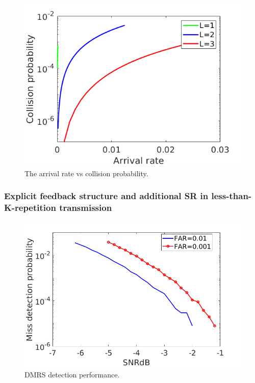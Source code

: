 \documentclass{ieeeaccess}
\begin{document}
\begin{figure}[htbp]
\centerline{\includegraphics[scale=0.32]{fig18.png}}
\caption{The arrival rate vs collision probability.}
\vspace{-2mm}
\label{fig18}

\end{figure}

\subsubsection{Explicit feedback structure and additional SR in less-than-K-repetition transmission}

\begin{figure}[htbp]
\centerline{\includegraphics[scale=0.22]{fig15.png}}
\caption{DMRS detection performance.}
\vspace{-2mm}
\label{fig15}

\end{figure}
\end{document}

